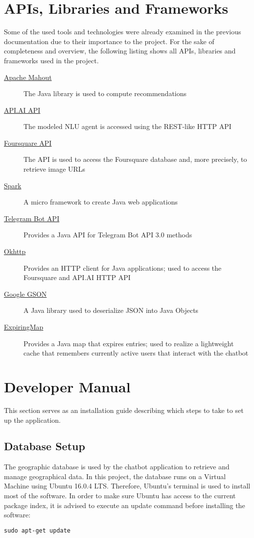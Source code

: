 \section{APIs, Libraries and Frameworks}
Some of the used tools and technologies were already examined in the previous documentation due to their importance to the project. For the sake of completeness and overview, the following listing shows all APIs, libraries and frameworks used in the project. 
\begin{description}
\item[\hyperlink{http://mahout.apache.org/}{Apache Mahout}] The Java library is used to compute recommendations
\item[\hyperlink{https://api.ai/docs/reference/agent/query}{API.AI API}] The modeled NLU agent is accessed using the REST-like HTTP API
\item[\hyperlink{https://developer.foursquare.com/}{Foursquare API}]The API is used to access the Foursquare database and, more precisely, to retrieve image URLs
\item[\hyperlink{https://spark.apache.org/}{Spark}] A micro framework to create Java web applications 
\item[\hyperlink{https://github.com/pengrad/java-telegram-bot-api}{Telegram Bot API}] Provides a Java API for Telegram Bot API 3.0 methods
\item[\hyperlink{http://square.github.io/okhttp/}{Okhttp}] Provides an HTTP client for Java applications; used to access the Foursquare and API.AI HTTP API 
\item[\hyperlink{https://github.com/google/gson}{Google GSON}] A Java library used to deserialize JSON into Java Objects
\item[\hyperlink{https://github.com/jhalterman/expiringmap}{ExpiringMap}] Provides a Java map that expires entries; used to realize a lightweight cache that remembers currently active users that interact with the chatbot
\end{description}

\section{Developer Manual}
This section serves as an installation guide describing which steps to take to set up the application. 

\subsection{Database Setup} \label{ssec:dbs}
The geographic database is used by the chatbot application to retrieve and manage geographical data. In this project, the database runs on a Virtual Machine using Ubuntu 16.0.4 LTS. Therefore, Ubuntu’s terminal is used to install most of the software. In order to make sure Ubuntu has access to the current package index, it is advised to execute an update command before installing the software:
\begin{lstlisting}
sudo apt-get update
\end{lstlisting}
